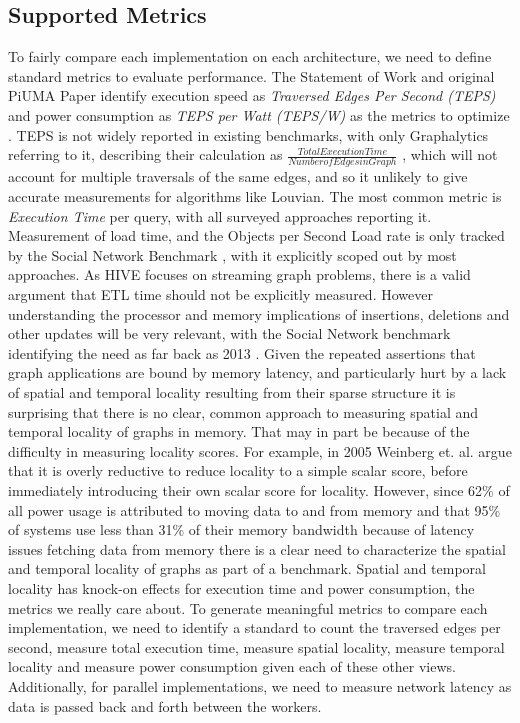 \documentclass[letterpaper, 10pt]{article}
\begin{document}
\begin{multicols}{2}
        \subsection{Supported Metrics}
        To fairly compare each implementation on each architecture, we need to define standard metrics to evaluate performance. 
        The Statement of Work and original PiUMA Paper identify execution speed as \textit{Traversed Edges Per Second (TEPS)} and power consumption as \textit{TEPS per Watt (TEPS/W)} as the metrics to optimize \cite{Aananthakrishnan2020}. 
        TEPS is not widely reported in existing benchmarks, with only Graphalytics referring to it, describing their calculation as $\frac{Total Execution Time}{Number of Edges in Graph}$ \cite{Capota2015}, which will not account for multiple traversals of the same edges, and so it unlikely to give accurate measurements for algorithms like Louvian.
        The most common metric is \textit{Execution Time} per query, with all surveyed approaches reporting it. 
        Measurement of load time, and the Objects per Second Load rate is only tracked by the Social Network Benchmark \cite{Angles2013}, with it explicitly scoped out by most approaches. 
        As HIVE focuses on streaming graph problems, there is a valid argument that ETL time should not be explicitly measured. 
        However understanding the processor and memory implications of insertions, deletions and other updates will be very relevant, with the Social Network benchmark identifying the need as far back as 2013 \cite{Angles2013}.
        Given the repeated assertions that graph applications are bound by memory latency, and particularly hurt by a lack of spatial and temporal locality resulting from their sparse structure \cite{Mutlu2023,Ren2010,Blondel2008,Capota2015,Beamer2017} it is surprising that there is no clear, common approach to measuring spatial and temporal locality of graphs in memory.
        That may in part be because of the difficulty in measuring locality scores. For example, in 2005 Weinberg et. al. argue that it is overly reductive to reduce locality to a simple scalar score, before immediately introducing their own scalar score for locality.
        However, since 62\% of all power usage is attributed to moving data to and from memory \cite{Mutlu2023} and that 95\% of systems use less than 31\% of their memory bandwidth \cite{Kanev2015} because of latency issues fetching data from memory there is a clear need to characterize the spatial and temporal locality of graphs as part of a benchmark. 
        Spatial and temporal locality has knock-on effects for execution time and power consumption, the metrics we really care about.
        To generate meaningful metrics to compare each implementation, we need to identify a standard to count the traversed edges per second, measure total execution time, measure spatial locality, measure temporal locality and measure power consumption given each of these other views.
        Additionally, for parallel implementations, we need to measure network latency as data is passed back and forth between the workers. 


\end{multicols}
\end{document}
